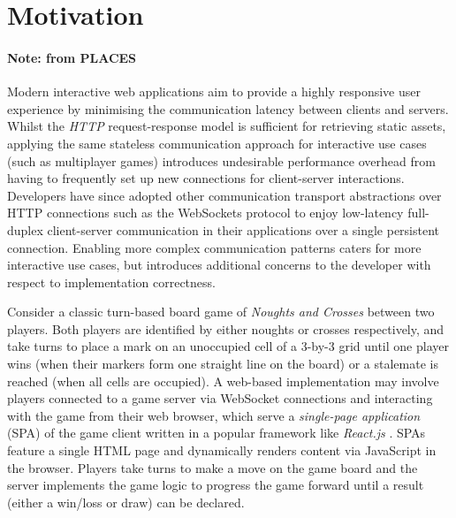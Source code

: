 \section{Motivation}

\paragraph{Note: from PLACES}


Modern interactive web applications aim to 
provide a highly responsive user experience by 
minimising the communication latency between clients and servers. 
Whilst the \textit{HTTP} request-response model is 
sufficient for retrieving static assets, applying the same 
stateless communication approach for interactive use cases 
(such as multiplayer games) introduces undesirable 
performance overhead from having to frequently set up 
new connections for client-server interactions. 
Developers have since adopted other communication 
transport abstractions over HTTP connections such as the WebSockets protocol \cite{WebSocketRFC} to enjoy low-latency full-duplex 
client-server communication in their applications over 
a single persistent connection. 
Enabling more complex communication patterns caters for 
more interactive use cases, but introduces additional 
concerns to the developer with respect to implementation correctness.

Consider a classic turn-based board game of \textit{Noughts and Crosses} 
between two players. Both players are identified by either noughts or crosses 
respectively, and take turns to place a mark on an unoccupied cell 
of a 3-by-3 grid until one player wins (when their markers form 
one straight line on the board) or a stalemate is reached 
(when all cells are occupied). A web-based implementation may 
involve players connected to a game server via WebSocket connections 
and interacting with the game from their web browser, which serve 
a \textit{single-page application} (SPA) of the game client written 
in a popular framework like \textit{React.js} \cite{React}. 
SPAs feature a single HTML page and dynamically renders content 
via JavaScript in the browser. 
Players take turns to make a move on the game board and the server 
implements the game logic to progress the game forward until 
a result (either a win/loss or draw) can be declared. 

